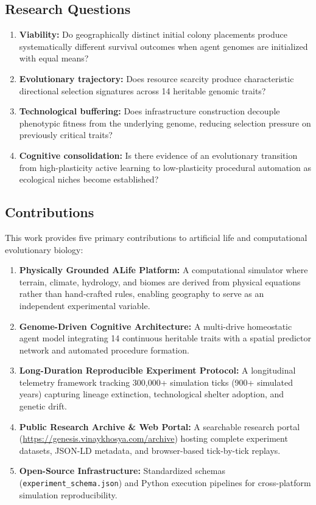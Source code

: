 \documentclass[12pt,a4paper]{article}
\begin{document}
\subsection{Research Questions}

\begin{enumerate}[label=\arabic*.]
  \item \textbf{Viability:} Do geographically distinct initial colony placements produce systematically different survival outcomes when agent genomes are initialized with equal means?
  \item \textbf{Evolutionary trajectory:} Does resource scarcity produce characteristic directional selection signatures across 14 heritable genomic traits?
  \item \textbf{Technological buffering:} Does infrastructure construction decouple phenotypic fitness from the underlying genome, reducing selection pressure on previously critical traits?
  \item \textbf{Cognitive consolidation:} Is there evidence of an evolutionary transition from high-plasticity active learning to low-plasticity procedural automation as ecological niches become established?
\end{enumerate}

\subsection{Contributions}

This work provides five primary contributions to artificial life and computational evolutionary biology:

\begin{enumerate}[label=\arabic*.]
  \item \textbf{Physically Grounded ALife Platform:} A computational simulator where terrain, climate, hydrology, and biomes are derived from physical equations rather than hand-crafted rules, enabling geography to serve as an independent experimental variable.
  \item \textbf{Genome-Driven Cognitive Architecture:} A multi-drive homeostatic agent model integrating 14 continuous heritable traits with a spatial predictor network and automated procedure formation.
  \item \textbf{Long-Duration Reproducible Experiment Protocol:} A longitudinal telemetry framework tracking 300,000+ simulation ticks (900+ simulated years) capturing lineage extinction, technological shelter adoption, and genetic drift.
  \item \textbf{Public Research Archive \& Web Portal:} A searchable research portal (\url{https://genesis.vinaykhosya.com/archive}) hosting complete experiment datasets, JSON-LD metadata, and browser-based tick-by-tick replays.
  \item \textbf{Open-Source Infrastructure:} Standardized schemas (\texttt{experiment\_schema.json}) and Python execution pipelines for cross-platform simulation reproducibility.
\end{enumerate}
\end{document}
